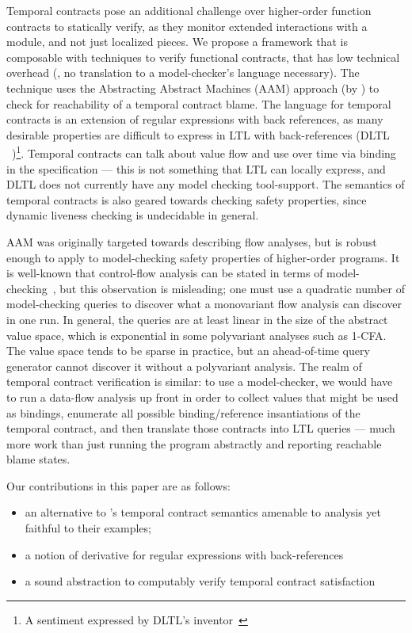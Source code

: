 Temporal contracts pose an additional challenge over higher-order function contracts to statically verify, as they monitor extended interactions with a module, and not just localized pieces.
%
We propose a framework that is composable with techniques to verify functional contracts, that has low technical overhead (\eg, no translation to a model-checker's language necessary).
%
The technique uses the Abstracting Abstract Machines (AAM) approach (by \citet{dvanhorn:VanHorn2010Abstracting}) to check for reachability of a temporal contract blame.
%
The language for temporal contracts is an extension of regular expressions with back references, as many desirable properties are difficult to express in LTL with back-references (DLTL ~\cite{ianjohnson:jlo})\footnote{A sentiment expressed by DLTL's inventor~\citep{boddenadmission}}.
%
Temporal contracts can talk about value flow and use over time via binding in the specification --- this is not something that LTL can locally express, and DLTL does not currently have any model checking tool-support.
%
The semantics of temporal contracts is also geared towards checking safety properties, since dynamic liveness checking is undecidable in general.

AAM was originally targeted towards describing flow analyses, but is robust enough to apply to model-checking safety properties of higher-order programs.
%
It is well-known that control-flow analysis can be stated in terms of model-checking~\citep{ianjohnson:analysis-is-mc}, but this observation is misleading; one must use a quadratic number of model-checking queries to discover what a monovariant flow analysis can discover in one run.
%
In general, the queries are at least linear in the size of the abstract value space, which is exponential in some polyvariant analyses such as 1-CFA. %
%
The value space tends to be sparse in practice, but an ahead-of-time query generator cannot discover it without a polyvariant analysis.
%
The realm of temporal contract verification is similar: to use a model-checker, we would have to run a data-flow analysis up front in order to collect values that might be used as bindings, enumerate all possible binding/reference insantiations of the temporal contract, and then translate those contracts into LTL queries --- much more work than just running the program abstractly and reporting reachable blame states.
%

Our contributions in this paper are as follows:
\begin{itemize}
 \item{an alternative to \dfm's temporal contract semantics amenable to analysis yet faithful to their examples;}
 \item{a notion of derivative for regular expressions with back-references}
 \item{a sound abstraction to computably verify temporal contract satisfaction}
\end{itemize}

